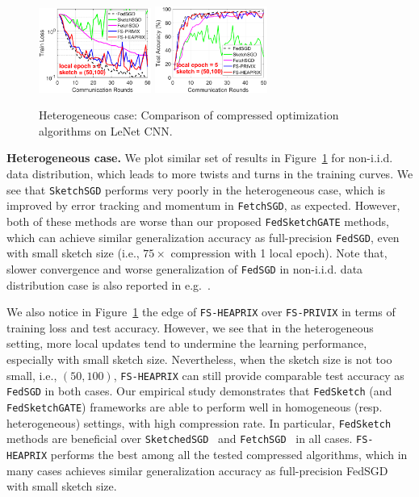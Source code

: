\documentclass{article} %
\begin{document}
\begin{figure}[t]
\begin{center}
{		\includegraphics[width=1.45in]{MNIST_figures/local5_sketch50_iid0_train_loss.eps}\hspace{-0.12in}
		\includegraphics[width=1.45in]{MNIST_figures/local5_sketch50_iid0_test_acc.eps}
		}
	\end{center}
	\vspace{-0.1in}
	\caption{Heterogeneous case: Comparison of compressed optimization algorithms on LeNet CNN.}
    \label{fig:MNIST-iid0}
    \vspace{-0.1in}
\end{figure}

\textbf{Heterogeneous case.} We plot similar set of results in Figure~\ref{fig:MNIST-iid0} for non-i.i.d. data distribution, which leads to more twists and turns in the training curves. 
We see that \texttt{SketchSGD} performs very poorly in the heterogeneous case, which is improved by error tracking and momentum in \texttt{FetchSGD}, as expected. However, both of these methods are worse than our proposed \texttt{FedSketchGATE} methods, which can achieve similar generalization accuracy as full-precision \texttt{FedSGD}, even with small sketch size (i.e., $75\times$ compression with 1 local epoch). 
Note that, slower convergence and worse generalization of \texttt{FedSGD} in non-i.i.d. data distribution case is also reported in e.g.~\cite{mcmahan2016communication,chen2020toward}. 

We also notice in Figure~\ref{fig:MNIST-iid0} the edge of \texttt{FS-HEAPRIX} over \texttt{FS-PRIVIX} in terms of training loss and test accuracy. 
However, we see that in the heterogeneous setting, more local updates tend to undermine the learning performance, especially with small sketch size.  
Nevertheless, when the sketch size is not too small, i.e., $(50,100)$, \texttt{FS-HEAPRIX} can still provide comparable test accuracy as \texttt{FedSGD} in both cases.
Our empirical study demonstrates that \texttt{FedSketch} (and \texttt{FedSketchGATE}) frameworks are able to perform well in homogeneous (resp. heterogeneous) settings, with high compression rate. 
In particular, \texttt{FedSketch} methods are beneficial over \texttt{SketchedSGD}~\citep{ivkin2019communication} and \texttt{FetchSGD}~\cite{rothchild2020fetchsgd} in all cases. 
\texttt{FS-HEAPRIX} performs the best among all the tested compressed algorithms, which in many cases achieves similar generalization accuracy as full-precision FedSGD with small sketch size. 
\end{document}

